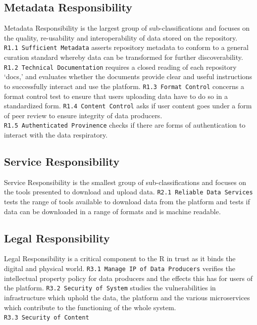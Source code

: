 \documentclass{article}
\begin{document}
\hypertarget{metadata-responsibility}{%
\subsection{Metadata Responsibility}\label{metadata-responsibility}}

Metadata Responsibility is the largest group of sub-classifications and
focuses on the quality, re-usability and interoperability of data stored
on the repository. \texttt{R1.1\ Sufficient\ Metadata} asserts
repository metadata to conform to a general curation standard whereby
data can be transformed for further discoverability.
\texttt{R1.2\ Technical\ Documentation} requires a closed reading of
each repository `docs,' and evaluates whether the documents provide
clear and useful instructions to successfully interact and use the
platform. \texttt{R1.3\ Format\ Control} concerns a format control test
to ensure that users uploading data have to do so in a standardized
form. \texttt{R1.4\ Content\ Control} asks if user content goes under a
form of peer review to ensure integrity of data producers.
\texttt{R1.5\ Authenticated\ Provinence} checks if there are forms of
authentication to interact with the data respiratory.

\hypertarget{service-responsibility}{%
\subsection{Service Responsibility}\label{service-responsibility}}

Service Responsibility is the smallest group of sub-classifications and
focuses on the tools presented to download and upload data.
\texttt{R2.1\ Reliable\ Data\ Services} tests the range of tools
available to download data from the platform and tests if data can be
downloaded in a range of formats and is machine readable.

\hypertarget{legal-responsibility}{%
\subsection{Legal Responsibility}\label{legal-responsibility}}

Legal Responsibility is a critical component to the R in trust as it
binds the digital and physical world.
\texttt{R3.1\ Manage\ IP\ of\ Data\ Producers} verifies the intellectual
property policy for data producers and the effects this has for users of
the platform. \texttt{R3.2\ Security\ of\ System} studies the
vulnerabilities in infrastructure which uphold the data, the platform
and the various microservices which contribute to the functioning of the
whole system. \texttt{R3.3\ Security\ of\ Content}
\end{document}
